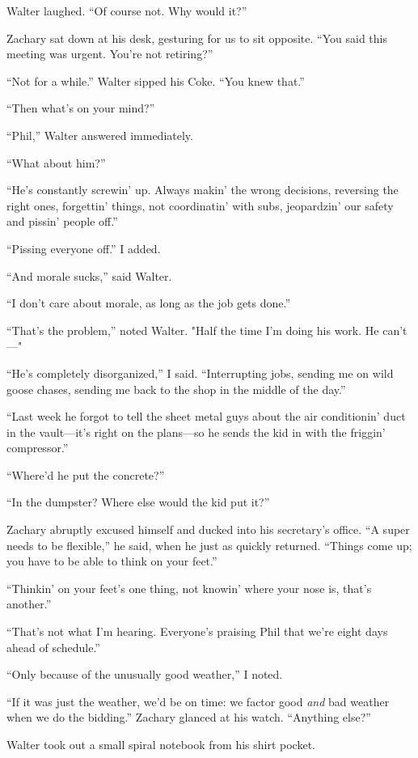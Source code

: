 Walter laughed. ``Of course not. Why would it?''

Zachary sat down at his desk, gesturing for us to sit opposite. ``You
said this meeting was urgent. You're not retiring?''

``Not for a while.'' Walter sipped his Coke. ``You knew that.''

``Then what's on your mind?''

``Phil,'' Walter answered immediately.

``What about him?''

``He's constantly screwin' up. Always makin' the wrong decisions,
reversing the right ones, forgettin' things, not coordinatin' with subs,
jeopardzin' our safety and pissin' people off.''

``Pissing everyone off.'' I added.

``And morale sucks,'' said Walter.

``I don't care about morale, as long as the job gets done.''

``That's the problem,'' noted Walter. "Half the time I'm doing his work.
He can't---"

``He's completely disorganized,'' I said. ``Interrupting jobs, sending
me on wild goose chases, sending me back to the shop in the middle of
the day.''

``Last week he forgot to tell the sheet metal guys about the air
conditionin' duct in the vault---it's right on the plans---so he sends
the kid in with the friggin' compressor.''

``Where'd he put the concrete?''

``In the dumpster? Where else would the kid put it?''

Zachary abruptly excused himself and ducked into his secretary's office.
``A super needs to be flexible,'' he said, when he just as quickly
returned. ``Things come up; you have to be able to think on your feet.''

``Thinkin' on your feet's one thing, not knowin' where your nose is,
that's another.''

``That's not what I'm hearing. Everyone's praising Phil that we're eight
days ahead of schedule.''

``Only because of the unusually good weather,'' I noted.

``If it was just the weather, we'd be on time: we factor good \emph{and}
bad weather when we do the bidding.'' Zachary glanced at his watch.
``Anything else?''

Walter took out a small spiral notebook from his shirt pocket.

